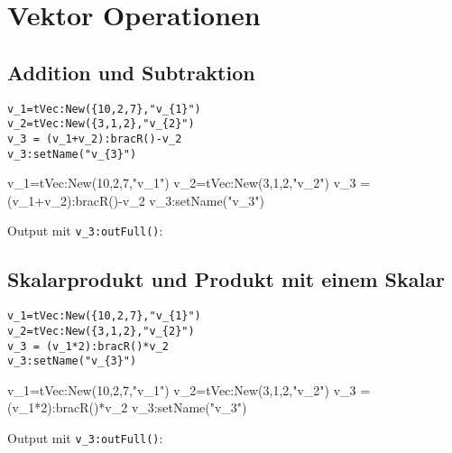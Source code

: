 \section{Vektor Operationen}
\subsection{Addition und Subtraktion}
\begin{lstlisting}
v_1=tVec:New({10,2,7},"v_{1}")
v_2=tVec:New({3,1,2},"v_{2}")
v_3 = (v_1+v_2):bracR()-v_2
v_3:setName("v_{3}")
\end{lstlisting}
\begin{luacode*}
	v_1=tVec:New({10,2,7},"v_{1}")
	v_2=tVec:New({3,1,2},"v_{2}")
	v_3 = (v_1+v_2):bracR()-v_2
	v_3:setName("v_{3}")
\end{luacode*}
Output mit \lstinline{v_3:outFull()}:
\subsection{Skalarprodukt und Produkt mit einem Skalar}
\begin{lstlisting}
v_1=tVec:New({10,2,7},"v_{1}")
v_2=tVec:New({3,1,2},"v_{2}")
v_3 = (v_1*2):bracR()*v_2
v_3:setName("v_{3}")
\end{lstlisting}
\begin{luacode*}
	v_1=tVec:New({10,2,7},"v_{1}")
	v_2=tVec:New({3,1,2},"v_{2}")
	v_3 = (v_1*2):bracR()*v_2
	v_3:setName("v_{3}")
\end{luacode*}
Output mit \lstinline{v_3:outFull()}:
